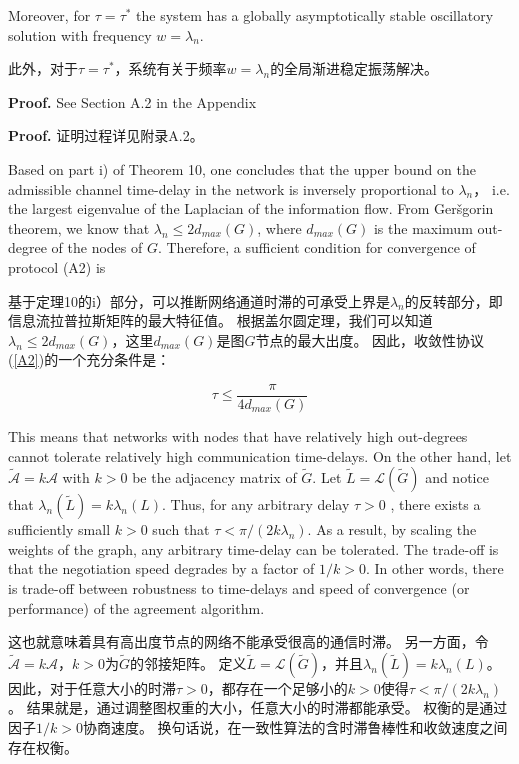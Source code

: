 \documentclass{article}
\begin{document}
{\color[gray]{0.5}
\noindent Moreover, for $\tau=\tau^*$ the system has a globally asymptotically stable oscillatory solution with frequency $w=\lambda_n$. 
}

\noindent 此外，对于$\tau=\tau^*$，系统有关于频率$w=\lambda_n$的全局渐进稳定振荡解决。

{\color[gray]{0.5}
\noindent \textbf{Proof.} See Section A.2 in the Appendix
}

\noindent \textbf{Proof.} 证明过程详见附录A.2。

{\color[gray]{0.5}
Based on part i) of Theorem 10, one concludes that the upper bound on the admissible channel time-delay in the network is inversely proportional to $\lambda_n$， i.e. the largest eigenvalue of the Laplacian of the information flow. 
From Ger\v sgorin theorem, we know that $\lambda_n\le 2d_{max}(G)$, where $d_{max}(G)$ is the maximum out-degree of the nodes of $G$. 
Therefore, a sufficient condition for convergence of protocol (A2) is 
}

基于定理10的i）部分，可以推断网络通道时滞的可承受上界是$\lambda_n$的反转部分，即信息流拉普拉斯矩阵的最大特征值。
根据盖尔圆定理，我们可以知道$\lambda_n\le 2d_{max}(G)$，这里$d_{max}(G)$是图$G$节点的最大出度。
因此，收敛性协议(\ref{A2})的一个充分条件是：

\begin{equation}
    \tau \le \frac{\pi}{4d_{max}(G)}
    \tag{40}
    \label{40}
\end{equation}

{\color[gray]{0.5}
\noindent This means that networks with nodes that have relatively high out-degrees cannot tolerate relatively high communication time-delays. 
On the other hand, let $\tilde{\mathcal{A}}=k\mathcal{A}$ with $k>0$ be the adjacency matrix of $\tilde{G}$. 
Let $\tilde{L}=\mathcal{L}(\tilde{G})$ and notice that $\lambda_n(\tilde{L}) = k\lambda_n(L)$. 
Thus, for any arbitrary delay $\tau>0$ , there exists a sufficiently small $k>0$ such that $\tau < \pi/(2k\lambda_n)$. 
As a result, by scaling the weights of the graph, any arbitrary time-delay can be tolerated. 
The trade-off is that the negotiation speed degrades by a factor of $1/k>0$. 
In other words, there is trade-off between robustness to time-delays and speed of convergence (or performance) of the agreement algorithm. 
}

\noindent 这也就意味着具有高出度节点的网络不能承受很高的通信时滞。
另一方面，令$\tilde{\mathcal{A}}=k\mathcal{A}$，$k>0$为$\tilde{G}$的邻接矩阵。
定义$\tilde{L}=\mathcal{L}(\tilde{G})$，并且$\lambda_n(\tilde{L}) = k\lambda_n(L)$。
因此，对于任意大小的时滞$\tau>0$，都存在一个足够小的$k>0$使得$\tau < \pi/(2k\lambda_n)$。
结果就是，通过调整图权重的大小，任意大小的时滞都能承受。
权衡的是通过因子$1/k>0$协商速度。
换句话说，在一致性算法的含时滞鲁棒性和收敛速度之间存在权衡。
\end{document}
